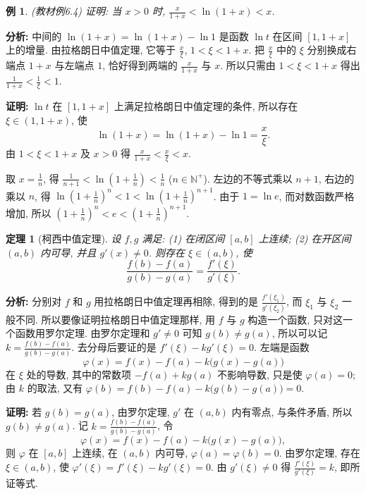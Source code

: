 \documentclass[UTF8,openany]{ctexbook}
\theoremstyle{chinesetextbook}
\newtheorem{example}{例}[section]
\newtheorem{theorem}{定理}[section]
\newenvironment{cnproof}{\par\indent\textbf{证明:} \ignorespaces}{\par}
\begin{document}
\begin{example}\label{ex:c2-6-4}
\textnormal{(教材例6.4)} 证明: 当 $x>0$ 时, $\displaystyle\frac x{1+x}<\ln(1+x)<x$.
\end{example}
\par\indent\textbf{分析:} 中间的 $\ln(1+x)=\ln(1+x)-\ln1$ 是函数 $\ln t$ 在区间 $[1,1+x]$ 上的增量. 由拉格朗日中值定理, 它等于 $\displaystyle\frac x\xi$, $1<\xi<1+x$. 把 $\displaystyle\frac x\xi$ 中的 $\xi$ 分别换成右端点 $1+x$ 与左端点 $1$, 恰好得到两端的 $\displaystyle\frac x{1+x}$ 与 $x$. 所以只需由 $1<\xi<1+x$ 得出 $\displaystyle\frac1{1+x}<\frac1\xi<1$.
\begin{cnproof}
$\ln t$ 在 $[1,1+x]$ 上满足拉格朗日中值定理的条件, 所以存在 $\xi\in(1,1+x)$, 使
\[
\ln(1+x)=\ln(1+x)-\ln1=\frac x\xi.
\]
由 $1<\xi<1+x$ 及 $x>0$ 得 $\displaystyle\frac x{1+x}<\frac x\xi<x$.
\end{cnproof}
取 $\displaystyle x=\frac1n$, 得 $\displaystyle\frac1{n+1}<\ln\left(1+\frac1n\right)<\frac1n$ ($n\in\mathbb N^+$). 左边的不等式乘以 $n+1$, 右边的乘以 $n$, 得 $\displaystyle\ln\left(1+\frac1n\right)^n<1<\ln\left(1+\frac1n\right)^{n+1}$. 由于 $1=\ln e$, 而对数函数严格增加, 所以 $\displaystyle\left(1+\frac1n\right)^n<e<\left(1+\frac1n\right)^{n+1}$.
\begin{theorem}[柯西中值定理]\label{thm:c2-6-cauchy}
设 $f,g$ 满足: (1) 在闭区间 $[a,b]$ 上连续; (2) 在开区间 $(a,b)$ 内可导, 并且 $g'(x)\ne0$. 则存在 $\xi\in(a,b)$, 使
\[
\frac{f(b)-f(a)}{g(b)-g(a)}=\frac{f'(\xi)}{g'(\xi)}.
\]
\end{theorem}
\par\indent\textbf{分析:} 分别对 $f$ 和 $g$ 用拉格朗日中值定理再相除, 得到的是 $\displaystyle\frac{f'(\xi_1)}{g'(\xi_2)}$, 而 $\xi_1$ 与 $\xi_2$ 一般不同. 所以要像证明拉格朗日中值定理那样, 用 $f$ 与 $g$ 构造一个函数, 只对这一个函数用罗尔定理. 由罗尔定理和 $g'\ne0$ 可知 $g(b)\ne g(a)$, 所以可以记 $\displaystyle k=\frac{f(b)-f(a)}{g(b)-g(a)}$. 去分母后要证的是 $f'(\xi)-kg'(\xi)=0$. 左端是函数
\[
\varphi(x)=f(x)-f(a)-k\bigl(g(x)-g(a)\bigr)
\]
在 $\xi$ 处的导数, 其中的常数项 $-f(a)+kg(a)$ 不影响导数, 只是使 $\varphi(a)=0$; 由 $k$ 的取法, 又有 $\varphi(b)=f(b)-f(a)-k\bigl(g(b)-g(a)\bigr)=0$.
\begin{cnproof}
若 $g(b)=g(a)$, 由罗尔定理, $g'$ 在 $(a,b)$ 内有零点, 与条件矛盾, 所以 $g(b)\ne g(a)$. 记 $\displaystyle k=\frac{f(b)-f(a)}{g(b)-g(a)}$, 令
\[
\varphi(x)=f(x)-f(a)-k\bigl(g(x)-g(a)\bigr),
\]
则 $\varphi$ 在 $[a,b]$ 上连续, 在 $(a,b)$ 内可导, $\varphi(a)=\varphi(b)=0$. 由罗尔定理, 存在 $\xi\in(a,b)$, 使 $\varphi'(\xi)=f'(\xi)-kg'(\xi)=0$. 由 $g'(\xi)\ne0$ 得 $\displaystyle\frac{f'(\xi)}{g'(\xi)}=k$, 即所证等式.
\end{cnproof}
\end{document}
